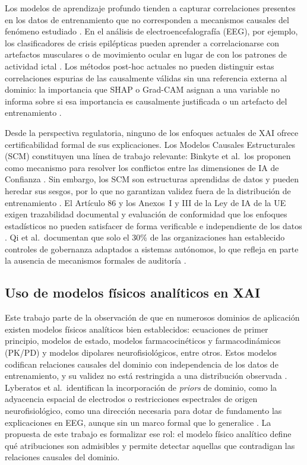 \documentclass[11pt,a4paper]{article}
\begin{document}
Los modelos de aprendizaje profundo tienden a capturar correlaciones presentes en los
datos de entrenamiento que no corresponden a mecanismos causales del fenómeno estudiado
\cite{binkyte2026causality, ghorbani2019interpretation}.
En el análisis de electroencefalografía (EEG), por ejemplo, los clasificadores de
crisis epilépticas pueden aprender a correlacionarse con artefactos musculares o de
movimiento ocular en lugar de con los patrones de actividad ictal \cite{lyberatos2026xai}.
Los métodos post-hoc actuales no pueden distinguir estas correlaciones espurias de
las causalmente válidas sin una referencia externa al dominio:
la importancia que SHAP o Grad-CAM asignan a una variable no informa sobre si esa
importancia es causalmente justificada o un artefacto del entrenamiento
\cite{haufe2026explainable, lyberatos2026xai}.

Desde la perspectiva regulatoria, ninguno de los enfoques actuales de XAI ofrece
certificabilidad formal de sus explicaciones.
Los Modelos Causales Estructurales (SCM) constituyen una línea de trabajo relevante:
Binkyte et al.\ los proponen como mecanismo para resolver los conflictos entre las
dimensiones de IA de Confianza \cite{binkyte2026trustworthy, binkyte2026causality}.
Sin embargo, los SCM son estructuras aprendidas de datos y pueden heredar sus sesgos,
por lo que no garantizan validez fuera de la distribución de entrenamiento
\cite{binkyte2026causality}.
El Artículo 86 y los Anexos~I y III de la Ley de IA de la UE exigen trazabilidad
documental y evaluación de conformidad que los enfoques estadísticos no pueden
satisfacer de forma verificable e independiente de los datos \cite{eu_ai_act_2024}.
Qi et al.\ documentan que solo el 30\% de las organizaciones han establecido controles
de gobernanza adaptados a sistemas autónomos, lo que refleja en parte la ausencia
de mecanismos formales de auditoría \cite{qi2026towards}.

\subsection{Uso de modelos físicos analíticos en XAI}

Este trabajo parte de la observación de que en numerosos dominios de aplicación
existen modelos físicos analíticos bien establecidos: ecuaciones de primer principio,
modelos de estado, modelos farmacocinéticos y farmacodinámicos (PK/PD) y modelos dipolares
neurofisiológicos, entre otros.
Estos modelos codifican relaciones causales del dominio con independencia de los datos
de entrenamiento, y su validez no está restringida a una distribución observada
\cite{lyberatos2026xai, binkyte2026causality}.
Lyberatos et al.\ identifican la incorporación de \textit{priors} de dominio,
como la adyacencia espacial de electrodos o restricciones espectrales de origen
neurofisiológico, como una dirección necesaria para dotar de fundamento las
explicaciones en EEG, aunque sin un marco formal que lo generalice \cite{lyberatos2026xai}.
La propuesta de este trabajo es formalizar ese rol: el modelo físico analítico
define qué atribuciones son admisibles y permite detectar aquellas que contradigan
las relaciones causales del dominio.
\end{document}
